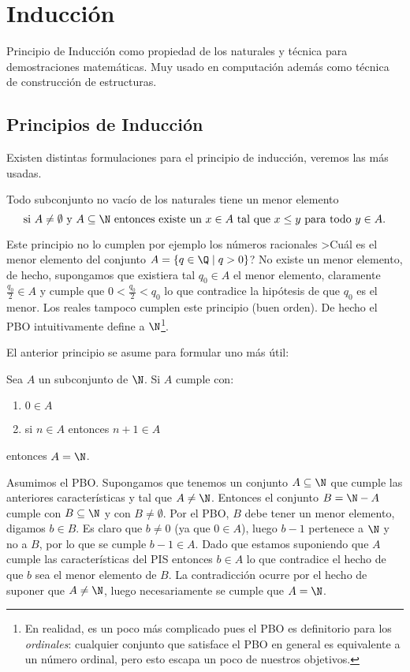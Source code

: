 \section{Inducción}

Principio de Inducción como propiedad de los naturales y técnica para demostraciones matemáticas.
Muy usado en computación además como técnica de construcción de estructuras.

\subsection{Principios de Inducción}
Existen distintas formulaciones para el principio de inducción, veremos las más usadas.

\begin{teorema}\label{teo:PBO}
Todo subconjunto no vacío de los naturales tiene un menor elemento\\
\[
\text{si }A\not=\emptyset \text{ y } A\subseteq \N\text{ entonces existe un }x\in A \text{ tal que } x\leq y \text{ para todo }y\in A. 
\]
\end{teorema}

Este principio no lo cumplen por ejemplo los números racionales
>Cuál es el menor elemento del conjunto $A=\{q\in \Q\;|\; q>0\}$? 
No existe un menor elemento, de hecho, supongamos que existiera tal $q_0\in A$ el menor elemento, claramente $\frac{q_0}{2}\in A$ y cumple que $0<\frac{q_0}{2}<q_0$ lo que contradice la hipótesis de que $q_0$ es el menor.
Los reales tampoco cumplen este principio (buen orden).
De hecho el PBO intuitivamente define a $\N$\footnote{En realidad, es un poco más complicado pues el PBO es definitorio para los \emph{ordinales}:
cualquier conjunto que satisface el PBO en general es equivalente a un número ordinal, pero esto escapa un poco de nuestros objetivos.}.

El anterior principio se asume para formular uno más útil:

\begin{teorema}
Sea $A$ un subconjunto de $\N$. Si $A$ cumple con:
\begin{enumerate}
  \item $0\in A$
  \item si $n\in A$ entonces $n+1\in A$
\end{enumerate}
entonces $A=\N$.

\begin{demostracion}
Asumimos el PBO.
Supongamos que tenemos un conjunto $A\subseteq\N$ que cumple las anteriores características y tal que $A\not=\N$.
Entonces el conjunto $B=\N-A$ cumple con $B\subseteq\N$ y con $B\not=\emptyset$.
Por el PBO, $B$ debe tener un menor elemento, digamos $b\in B$.
Es claro que $b\not=0$ (ya que $0\in A$), luego $b-1$ pertenece a $\N$ y no a $B$, por lo que se cumple $b-1\in A$.
Dado que estamos suponiendo que $A$ cumple las características del PIS entonces $b\in A$ lo que contradice el hecho de que $b$ sea el menor elemento de $B$.
La contradicción ocurre por el hecho de suponer que $A\not=\N$, luego necesariamente se cumple que $A=\N$.
\end{demostracion}
\end{teorema}

